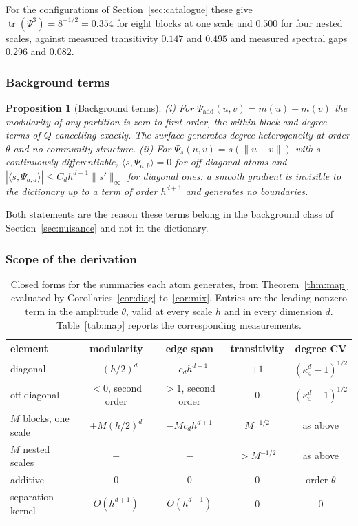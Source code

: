 \documentclass[11pt]{article}
\newtheorem{proposition}[theorem]{Proposition}
\theoremstyle{definition}
\newcommand{\1}{\mathbf 1}\newcommand{\op}{\operatorname}
\begin{document}
For the configurations of Section~\ref{sec:catalogue} these give
$\operatorname{tr}(\Psi^{3})=8^{-1/2}=0.354$ for eight blocks at one scale and
$0.500$ for four nested scales, against measured transitivity $0.147$ and
$0.495$ and measured spectral gaps $0.296$ and $0.082$.

\subsubsection{Background terms}

\begin{proposition}[Background terms]                         \label{prop:background}
\textup{(i)} For $\Psi_{\mathrm{add}}(u,v)=m(u)+m(v)$ the modularity of any
partition is zero to first order, the within-block and degree terms of $Q$
cancelling exactly.  The surface generates degree heterogeneity at order
$\theta$ and no community structure.  \textup{(ii)} For
$\Psi_s(u,v)=s(\|u-v\|)$ with $s$ continuously differentiable,
$\langle s,\Psi_{a,b}\rangle=0$ for off-diagonal atoms and
$|\langle s,\Psi_{a,a}\rangle|\le C_dh^{d+1}\|s'\|_\infty$ for diagonal ones: a
smooth gradient is invisible to the dictionary up to a term of order
$h^{d+1}$ and generates no boundaries.
\end{proposition}

Both statements are the reason these terms belong in the background class of
Section~\ref{sec:nuisance} and not in the dictionary.

\subsubsection{Scope of the derivation}

\begin{table}[t]\centering
\caption{Closed forms for the summaries each atom generates, from
Theorem~\ref{thm:map} evaluated by Corollaries~\ref{cor:diag} to~\ref{cor:mix}.
Entries are the leading nonzero term in the amplitude $\theta$, valid at every
scale $h$ and in every dimension $d$.  Table~\ref{tab:map} reports the
corresponding measurements.}                                        \label{app:tab-map}
\begin{tabular}{lcccc}
\hline
element & modularity & edge span & transitivity & degree CV\\
\hline
diagonal              & $+(h/2)^{d}$ & $-c_dh^{d+1}$ & $+1$ & $(\kappa_4^{d}-1)^{1/2}$\\
off-diagonal          & $<0$, second order & $>1$, second order & $0$ & $(\kappa_4^{d}-1)^{1/2}$\\
$M$ blocks, one scale & $+M(h/2)^{d}$ & $-Mc_dh^{d+1}$ & $M^{-1/2}$ & as above\\
$M$ nested scales     & $+$ & $-$ & $>M^{-1/2}$ & as above\\
additive              & $0$ & $0$ & $0$ & order $\theta$\\
separation kernel     & $O(h^{d+1})$ & $O(h^{d+1})$ & $0$ & $0$\\
\hline
\end{tabular}
\end{table}
\end{document}
